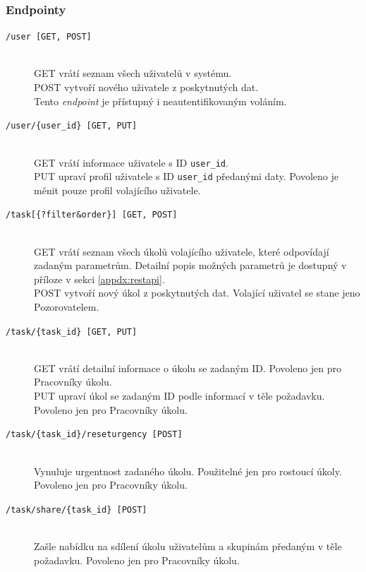 \documentclass[thesis=B,czech]{FITthesis}[2012/06/26]
\newcommand{\forworkers}{Povoleno jen pro Pracovníky úkolu.}
\begin{document}
			\subsubsection{Endpointy}
			\label{sec:rest-api}
			\begin{description}			
			\item[\texttt{/user [GET, POST]}] \hfill \\
				GET vrátí seznam všech uživatelů v systému. \\
				POST vytvoří nového uživatele z poskytnutých dat. \\
				
				Tento \textit{endpoint} je přístupný i neautentifikovaným voláním.
				
			\item[\texttt{/user/\{user\_id\} [GET, PUT]}] \hfill \\
				GET vrátí informace uživatele s ID \texttt{user\_id}. \\
				PUT upraví profil uživatele s ID \texttt{user\_id} předanými daty. Povoleno je měnit pouze profil volajícího uživatele.
			
			\item[\texttt{/task[\{?filter\&order\}] [GET, POST]}] \hfill \\
				GET vrátí seznam všech úkolů volajícího uživatele, které odpovídají zadaným parametrům. Detailní popis možných parametrů je dostupný v příloze v sekci \ref{appdx:restapi}. \\
				POST vytvoří nový úkol z poskytnutých dat. Volající uživatel se stane jeno Pozorovatelem.
			
			\item[\texttt{/task/\{task\_id\} [GET, PUT]}] \hfill \\
				GET vrátí detailní informace o úkolu se zadaným ID. \forworkers \\
				PUT upraví úkol se zadaným ID podle informací v těle požadavku. \forworkers
			
			\item[\texttt{/task/\{task\_id\}/reseturgency [POST]}] \hfill \\
				Vynuluje urgentnost zadaného úkolu. Použitelné jen pro rostoucí úkoly. \forworkers
			
			\item[\texttt{/task/share/\{task\_id\} [POST]}] \hfill \\
				Zašle nabídku na sdílení úkolu uživatelům a skupinám předaným v těle požadavku. \forworkers
			

\end{description}
\end{document}
